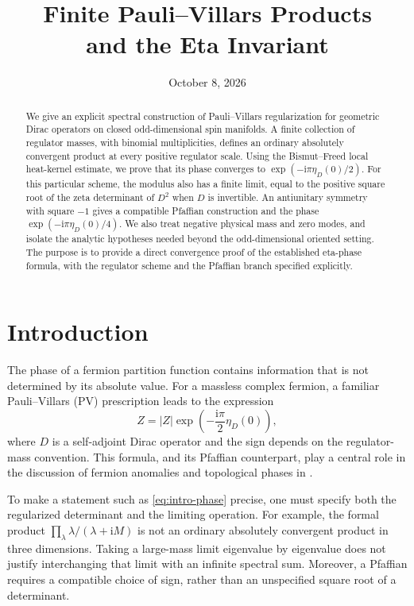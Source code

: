 \documentclass[11pt,a4paper]{article}
\title{\bfseries Finite Pauli--Villars Products\\and the Eta Invariant}
\author{}
\date{October 8, 2026}
\theoremstyle{remark}
\newcommand{\ii}{\mathrm i}
\numberwithin{equation}{section}
\begin{document}
\maketitle

\begin{abstract}
We give an explicit spectral construction of Pauli--Villars regularization
for geometric Dirac operators on closed odd-dimensional spin manifolds.
A finite collection of regulator masses, with binomial multiplicities,
defines an ordinary absolutely convergent product at every positive
regulator scale. Using the Bismut--Freed local heat-kernel estimate, we
prove that its phase converges to $\exp(-\ii\pi\eta_D(0)/2)$.
For this particular scheme, the modulus also has a finite limit, equal to
the positive square root of the zeta determinant of $D^2$ when $D$ is
invertible. An antiunitary symmetry with square $-1$ gives a compatible
Pfaffian construction and the phase $\exp(-\ii\pi\eta_D(0)/4)$.
We also treat negative physical mass and zero modes, and isolate the
analytic hypotheses needed beyond the odd-dimensional oriented setting.
The purpose is to provide a direct convergence proof of the established
eta-phase formula, with the regulator scheme and the Pfaffian branch
specified explicitly.
\end{abstract}

\section{Introduction}\label{sec:intro}

The phase of a fermion partition function contains information that is
not determined by its absolute value. For a massless complex fermion,
a familiar Pauli--Villars (PV) prescription leads to the expression
\begin{equation}\label{eq:intro-phase}
 Z=|Z|\exp\!\left(-\frac{\ii\pi}{2}\eta_D(0)\right),
\end{equation}
where $D$ is a self-adjoint Dirac operator and the sign depends on the
regulator-mass convention. This formula, and its Pfaffian counterpart,
play a central role in the discussion of fermion anomalies and
topological phases in \cite{Witten,WY}.

To make a statement such as \eqref{eq:intro-phase} precise, one must
specify both the regularized determinant and the limiting operation.
For example, the formal product
$\prod_\lambda\lambda/(\lambda+\ii M)$ is not an ordinary absolutely
convergent product in three dimensions. Taking a large-mass limit
eigenvalue by eigenvalue does not justify interchanging that limit with
an infinite spectral sum. Moreover, a Pfaffian requires a compatible
choice of sign, rather than an unspecified square root of a determinant.
\end{document}
